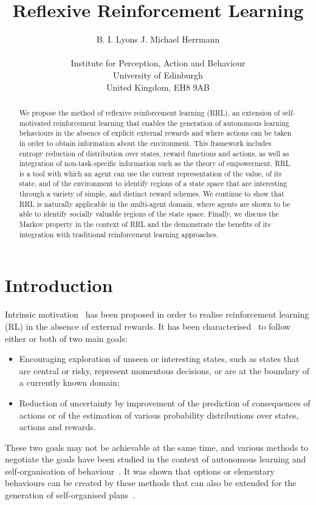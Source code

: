 \documentclass{article}
\title{Reflexive Reinforcement Learning}
\author{
  B. I. Lyons \quad J. Michael Herrmann \\
  \\
  Institute for Perception, Action and Behaviour\\
  University of Edinburgh\\
  United Kingdom, EH8 9AB \\
}
\begin{document}
\maketitle

\begin{abstract}
We propose the method of reflexive reinforcement learning (RRL), an extension of self-motivated reinforcement learning that enables the generation of autonomous learning behaviours in the absence of explicit external rewards and where actions can be taken in order to obtain information about the environment. This framework includes entropy reduction of distribution over states, reward functions and actions, as well as integration of non-task-specific information such as the theory of empowerment. RRL is a tool with which an agent can use the current representation of the value, of its state, and of the environment to identify regions of a state space that are interesting through a variety of simple, and distinct reward schemes. We continue to show that RRL is naturally applicable in the multi-agent domain, where agents are shown to be able to identify socially valuable regions of the state space.%
%
Finally, we discuss the Markov property in the context of RRL and the demonstrate the benefits of its integration with traditional reinforcement learning approaches.
\end{abstract}

\section{Introduction}

Intrinsic motivation~\cite{chentanez2005intrinsically} has been proposed in order to realise 
reinforcement learning (RL) in the absence of external rewards. It has been 
characterised~\cite{pathak2017curiosity} to follow either or both of two main goals:
\begin{itemize}
	\item Encouraging exploration of unseen or interesting states, such as states that
		are central or risky, represent momentous decisions, or are at the 
		boundary of a currently known domain;
	\item Reduction of uncertainty by improvement of the prediction of consequences of 
		actions or of the estimation of various probability distributions over
		states, actions and rewards.
\end{itemize}
These two goals may not be achievable at the same time, and various methods to negotiate the
goals have been studied in the context of autonomous learning and self-organisation 
of behaviour~\cite{bialek1999predictive,der2012playful,klyubin2005empowerment}.
It was shown that options or elementary behaviours can be created by these methods that can 
also be extended for the generation of self-organised plans~\cite{blaes2019control}. 
\end{document}
